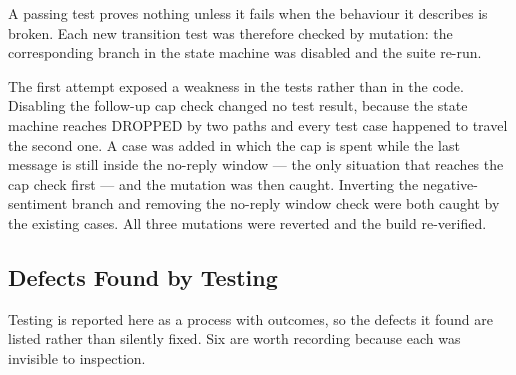 \documentclass[a4paper]{article}
\begin{document}
A passing test proves nothing unless it fails when the behaviour it describes
is broken. Each new transition test was therefore checked by mutation: the
corresponding branch in the state machine was disabled and the suite re-run.

The first attempt exposed a weakness in the tests rather than in the code.
Disabling the follow-up cap check changed no test result, because the state
machine reaches DROPPED by two paths and every test case happened to travel
the second one. A case was added in which the cap is spent while the last
message is still inside the no-reply window --- the only situation that reaches
the cap check first --- and the mutation was then caught. Inverting the
negative-sentiment branch and removing the no-reply window check were both
caught by the existing cases. All three mutations were reverted and the build
re-verified.

\subsection{Defects Found by Testing}

Testing is reported here as a process with outcomes, so the defects it found
are listed rather than silently fixed. Six are worth recording because each
was invisible to inspection.
\end{document}
